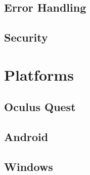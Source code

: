 \subsection{Error Handling}

\subsection{Security}

\section{Platforms}
\subsection{Oculus Quest}
\subsection{Android}
\subsection{Windows}
